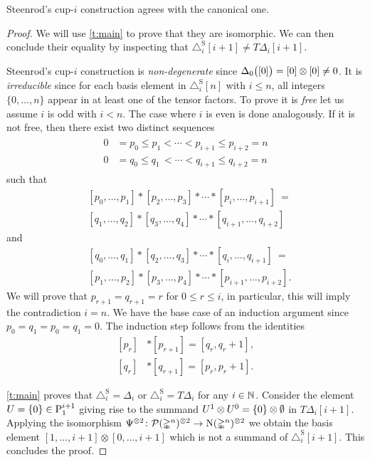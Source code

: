\begin{theorem} \label{t:steenrod cup-i}
	Steenrod's \mbox{cup-$i$} construction agrees with the canonical one.
\end{theorem}

\begin{proof}
	We will use \cref{t:main} to prove that they are isomorphic.
	We can then conclude their equality by inspecting that $\triangle^{\mathrm{S}}_i [i+1] \neq T \Delta_i [i+1]$.

	Steenrod's \mbox{cup-$i$} construction is \emph{non-degenerate} since $\Delta_0\big([0]\big) = [0] \otimes [0] \neq 0$.
	It is \emph{irreducible} since for each basis element in $\triangle^{\mathrm{S}}_i [n]$ with $i \leq n$, all integers $\{0, \dots, n\}$ appear in at least one of the tensor factors.
	To prove it is \emph{free} let us assume $i$ is odd with $i < n$.
	The case where $i$ is even is done analogously.
	If it is not free, then there exist two distinct sequences
	\begin{align*}
	\begin{split}
	0 &= p_0 \leq p_1 < \cdots < p_{i+1} \leq p_{i+2} = n \\
	0 &= q_0 \leq q_1 \,< \cdots < q_{i+1} \leq q_{i+2} = n
	\end{split}
	\end{align*}
	such that
	\[
	\begin{split}
	&[ {p_0}, \dots, {p_1} ] \ast [ {p_2}, \dots, {p_3} ] \ast \cdots \ast [ {p_{i}}, \dots, {p_{i+1}} ]\ = \\
	&[ {q_1}, \dots, {q_2} ] \ast [ {q_3}, \dots, {q_4} ] \ast \cdots \ast [ {q_{i+1}}, \dots, {q_{i+2}} ]
	\end{split}
	\]
	and
	\[
	\begin{split}
	&[ {q_0}, \dots, {q_1} ] \ast [ {q_2}, \dots, {q_3} ] \ast \cdots \ast [ {q_{i}}, \dots, {q_{i+1}} ]\ = \\
	&[ {p_1}, \dots, {p_2} ] \ast [ {p_3}, \dots, {p_4} ] \ast \cdots \ast [ {p_{i+1}}, \dots, {p_{i+2}} ].
	\end{split}
	\]
	We will prove that $p_{r+1} = q_{r+1} = r$ for $0 \leq r \leq i$, in particular, this will imply the contradiction $i = n$.
	We have the base case of an induction argument since $p_0 = q_1 = p_0 = q_1 = 0$.
	The induction step follows from the identities
	\[
	\begin{split}
	[p_r] &\ast [p_{r+1}] = [q_r, q_{r}+1], \\
	[q_r] &\ast [q_{r+1}] = [p_r, p_{r}+1].
	\end{split}
	\]

	\cref{t:main} proves that $\triangle^{\mathrm{S}}_i = \Delta_i$ or $\triangle^{\mathrm{S}}_i = T \Delta_i$ for any $i \in \mathbb{N}$.
	Consider the element $U = \{0\} \in \mathrm{P}_{1}^{i+1}$ giving rise to the summand $U^1 \otimes U^0 = \{0\} \otimes \emptyset$ in $T \Delta_i [i+1]$.
	Applying the isomorphism $\Psi^{\otimes 2} \colon \mathcal{P}(\mathbb{\Delta}^n)^{\otimes 2} \to \operatorname{N}(\mathbb{\Delta}^n)^{\otimes 2}$ we obtain the basis element $[1,\dots,i+1] \otimes [0,\dots,i+1]$ which is not a summand of $\triangle^{\mathrm{S}}_i [i+1]$.
	This concludes the proof.
\end{proof}

